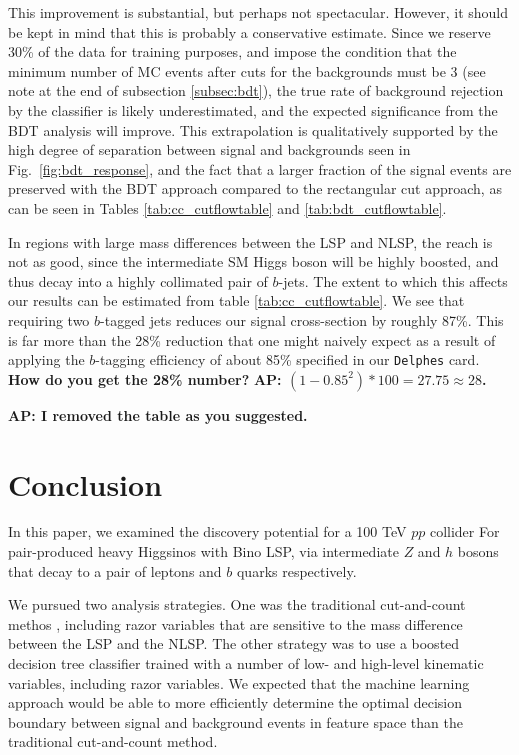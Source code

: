 \documentclass[a4paper,11pt]{article}
\newcommand{\Shufang}[1]{{\bf\color{Maroon}  #1}}
\newcommand{\Adarsh}[1]{{\bf\color{RoyalBlue} AP: #1}}
\begin{document}
This improvement is substantial, but perhaps not spectacular. However, it should
be kept in mind that this is probably a conservative estimate. Since we reserve
30\% of the data for training purposes, and impose the condition that the
minimum number of MC events after cuts for the backgrounds must be 3 (see note
at the end of subsection \ref{subsec:bdt}), the true rate of background
rejection by the classifier is likely underestimated, and the expected
significance from the BDT analysis will improve. This extrapolation is
qualitatively supported by the high degree of separation between signal and
backgrounds seen in Fig.~\ref{fig:bdt_response}, and the fact that a larger
fraction of the signal events are preserved with the BDT approach compared to
the rectangular cut approach, as can be seen in Tables \ref{tab:cc_cutflowtable}
and \ref{tab:bdt_cutflowtable}.  

In regions with large mass differences between the LSP and NLSP, the reach is
not as good, since the intermediate SM Higgs boson will be highly boosted, and
thus decay into a highly collimated pair of $b$-jets. The extent to which this
affects our results can be estimated from table \ref{tab:cc_cutflowtable}. We
see that requiring two $b$-tagged jets reduces our signal cross-section by
roughly 87\%. This is far more than the 28\% reduction that one might naively
expect as a result of applying the $b$-tagging efficiency of about 85\%
specified in our \texttt{Delphes} card.  \Shufang{How do you get the 28\%
number? } \Adarsh{$(1 - 0.85^2)*100 = 27.75 \approx 28$.}

\Adarsh{I removed the table as you suggested.}


\section{Conclusion}\label{sec:conclusion}

In this paper, we examined the discovery potential for a 100 TeV $pp$ collider For 
pair-produced heavy Higgsinos with Bino LSP, via 
intermediate $Z$ and $h$ bosons that decay to a pair of leptons and $b$ quarks
respectively.   

We pursued two analysis strategies. One was the traditional cut-and-count methos , including razor variables
that are sensitive to the mass difference between the LSP and the NLSP. The
other strategy was to use a boosted decision tree classifier trained with a
number of low- and high-level kinematic variables, including razor variables. We expected
that the machine learning approach would be able to more efficiently determine
the optimal decision boundary between signal and background events in feature
space than the traditional   cut-and-count method.
\end{document}
